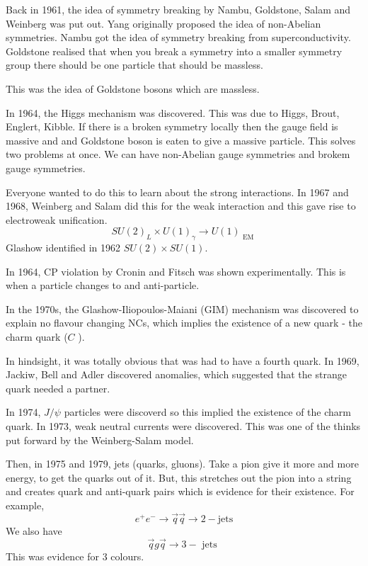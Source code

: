 \documentclass[11pt, oneside]{article}   	%
\theoremstyle{slanted}
\begin{document}
Back in 1961, the idea of symmetry breaking 
by Nambu, Goldstone, Salam and Weinberg 
was put out. Yang originally proposed the 
idea of non-Abelian symmetries. 
Nambu got the idea of symmetry breaking 
from superconductivity. 
Goldstone realised that 
when you break a symmetry 
into a smaller symmetry group 
there should be one particle 
that should be massless. 

This was the idea of Goldstone bosons 
which are massless. 

In 1964, 
the Higgs mechanism was discovered. This 
was due to Higgs, Brout, Englert, Kibble. 
If there is a broken symmetry locally then 
the gauge field is massive and 
and Goldstone boson is eaten to give a massive particle. 
This solves two problems at once. 
We can have non-Abelian gauge symmetries 
and brokem gauge symmetries. 

Everyone wanted to do this 
to learn about the strong interactions. 
In 1967 and 1968,
Weinberg and Salam did this 
for the weak interaction and 
this gave rise to electroweak 
unification. 
\[
 SU ( 2 )_ L \times U \left( 1  \right)  _{ \gamma } 
 \to U (1 ) _{ \text{ EM } } 
\] Glashow identified in 1962 $ SU ( 2) \times SU ( 1 ) $. 

In 1964, CP violation 
by Cronin and Fitsch was 
shown experimentally. 
This is when a particle changes to 
and anti-particle. 

In the 1970s, 
the Glashow-Iliopoulos-Maiani (GIM) 
mechanism was discovered to 
explain no flavour changing 
NCs, which implies the existence of a 
new quark - the charm quark ($ C $  ). 

In hindsight, it was 
totally obvious that was had to 
have a fourth quark. 
In 1969, Jackiw, Bell and Adler 
discovered anomalies, 
which suggested that the strange quark 
needed a partner. 

In 1974, $ J / \psi $ 
particles were discoverd so this implied 
the existence of the charm quark.
In 1973, weak neutral 
currents were discovered. 
This was one of the thinks 
put forward by the Weinberg-Salam model. 

Then, in 1975 and 1979, 
jets (quarks, gluons). 
Take a pion give it more and more energy, 
to get the quarks out of it. 
But, this stretches out 
the pion into a string and 
creates quark and anti-quark pairs
which is evidence for their existence. 
For example, 
\[
 e ^ + e ^  - \to \vec{q} \vec{q} \to 2 -\text{jets}
\] 
We also have 
\[
 \vec{q} g \vec{q} \to 3 - \text{ jets }
\] This 
was evidence for 3 colours. 
\end{document}
